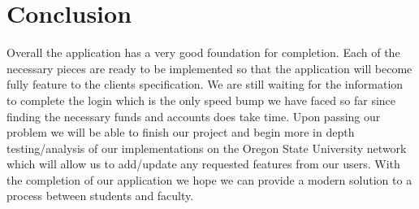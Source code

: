 \documentclass[draftclsnofoot, onecolumn, letterpaper, 10pt]{IEEEtran}
\begin{document}
\section{Conclusion}
Overall the application has a very good foundation for completion. Each of the necessary pieces are ready to be implemented so that the application will become fully feature to the clients specification. We are still waiting for the information to complete the login which is the only speed bump we have faced so far since finding the necessary funds and accounts does take time. Upon passing our problem we will be able to finish our project and begin more in depth testing/analysis of our implementations on the Oregon State University network which will allow us to add/update any requested features from our users. With the completion of our application we hope we can provide a modern solution to a process between students and faculty. 
\end{document}
